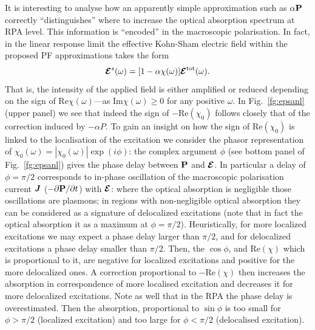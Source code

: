 It is interesting to analyse how an apparently simple approximation such as $\alpha {\bf P}$ correctly ``distinguishes'' where to increase the optical absorption spectrum at RPA level. This information is ``encoded'' in the macroscopic polarisation. In fact, in the linear response limit the effective Kohn-Sham electric field within the proposed PF approximations takes the form $$\boldsymbol{\cal E}^{s} (\omega)= [1 -\alpha \chi(\omega)] \boldsymbol{\cal E}^{\text{tot}} (\omega).$$ That is, the intensity of the applied field is either amplified or reduced depending on the sign of $\text{Re}\chi(\omega)$---as $\text{Im}\chi(\omega) \ge 0$ for any positive $\omega$. In Fig.~\ref{fg:epsanl} (upper panel) we see that indeed the sign of $-\text{Re}(\chi_0)$ follows closely that of the correction induced by $-\alpha P$. 
To gain an insight on how the sign of $\text{Re}(\chi_0)$ is linked to the localisation of the excitation we consider the phasor representation of $\chi_0(\omega) = |\chi_0(\omega)|\exp{(i\phi)}$: the complex argument $\phi$ (see bottom panel of Fig.~\ref{fg:epsanl}) gives the phase delay between ${\bf P}$ and $\boldsymbol{\cal E}$. In particular a delay of $\phi = \pi/2$ corresponds to in-phase oscillation of the macroscopic polarisation current ${\boldsymbol J}$ ($-\partial {\bf P}/\partial t$) with $\boldsymbol{\cal E}$: where the optical absorption is negligible those oscillations are plasmons; in regions with non-negligible optical absorption they can be considered as a signature of delocalized excitations (note that in fact the optical absorption it as a maximum at $\phi=\pi/2$).  Heuristically, for more localized excitations we may expect a phase delay larger than $\pi/2$, and for delocalized excitations a phase delay smaller than $\pi/2$.
Then, the $\cos\phi$, and $\text{Re}(\chi)$ which is proportional to it, are negative for localized excitations and positive for the more delocalized ones. A correction proportional to  $-\text{Re}(\chi)$ then increases the absorption in correspondence of more localised excitation and decreases it for more delocalized excitations. Note as well that in the RPA the phase delay is overestimated. Then the absorption, proportional to $\sin\phi$ is too small for $\phi > \pi/2$ (localized excitation) and too large for $\phi < \pi/2$ (delocalised  excitation).
